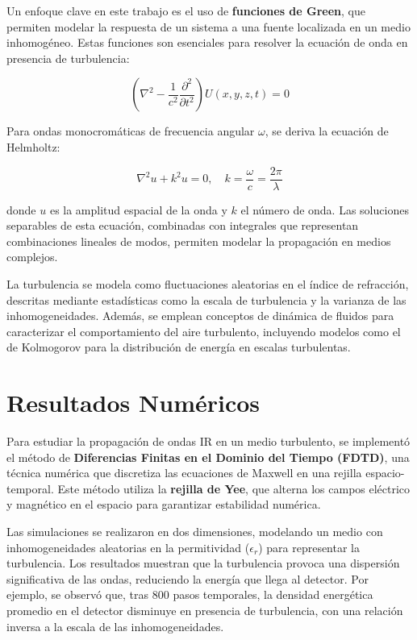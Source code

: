 Un enfoque clave en este trabajo es el uso de \textbf{funciones de Green}, que permiten modelar la respuesta de un sistema a una fuente localizada en un medio inhomogéneo. Estas funciones son esenciales para resolver la ecuación de onda en presencia de turbulencia:

\[
\left( \nabla^2 - \frac{1}{c^2} \frac{\partial^2}{\partial t^2} \right) U(x, y, z, t) = 0
\]

Para ondas monocromáticas de frecuencia angular \(\omega\), se deriva la ecuación de Helmholtz:

\[
\nabla^2 u + k^2 u = 0, \quad k = \frac{\omega}{c} = \frac{2\pi}{\lambda}
\]

donde \(u\) es la amplitud espacial de la onda y \(k\) el número de onda. Las soluciones separables de esta ecuación, combinadas con integrales que representan combinaciones lineales de modos, permiten modelar la propagación en medios complejos.

La turbulencia se modela como fluctuaciones aleatorias en el índice de refracción, descritas mediante estadísticas como la escala de turbulencia y la varianza de las inhomogeneidades. Además, se emplean conceptos de dinámica de fluidos para caracterizar el comportamiento del aire turbulento, incluyendo modelos como el de Kolmogorov para la distribución de energía en escalas turbulentas.

\section{Resultados Numéricos}

Para estudiar la propagación de ondas IR en un medio turbulento, se implementó el método de \textbf{Diferencias Finitas en el Dominio del Tiempo (FDTD)}, una técnica numérica que discretiza las ecuaciones de Maxwell en una rejilla espacio-temporal. Este método utiliza la \textbf{rejilla de Yee}, que alterna los campos eléctrico y magnético en el espacio para garantizar estabilidad numérica.

Las simulaciones se realizaron en dos dimensiones, modelando un medio con inhomogeneidades aleatorias en la permitividad (\(\epsilon_r\)) para representar la turbulencia. Los resultados muestran que la turbulencia provoca una dispersión significativa de las ondas, reduciendo la energía que llega al detector. Por ejemplo, se observó que, tras 800 pasos temporales, la densidad energética promedio en el detector disminuye en presencia de turbulencia, con una relación inversa a la escala de las inhomogeneidades.

